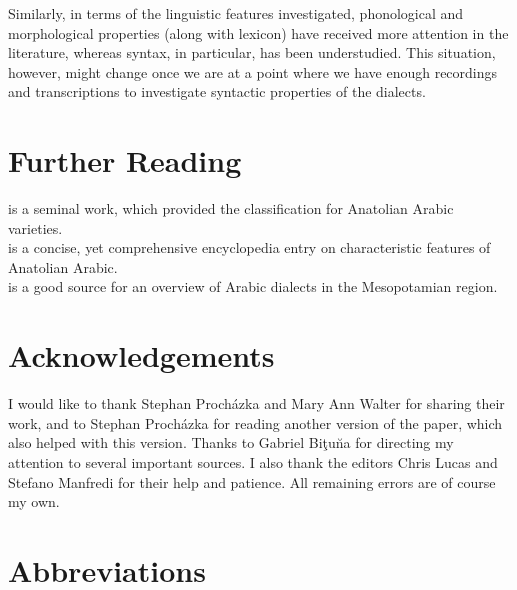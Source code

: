 \documentclass[output=paper]{langsci/langscibook}
\begin{document}
Similarly, in terms of the linguistic features investigated, phonological and morphological properties (along with lexicon) have received more attention in the literature, whereas syntax, in particular, has been understudied. This situation, however, might change once we are at a point where we have enough recordings and transcriptions to investigate syntactic properties of the dialects. 

\section*{Further Reading}
 
\citet{Jastrow1978} is a seminal work, which provided the classification for Anatolian Arabic varieties. \\
\citet{Jastrow2011anatolian} is a concise, yet comprehensive encyclopedia entry on characteristic features of Anatolian Arabic.\\
\noindent \citet{Talay2011} is a good source for an overview of Arabic dialects in the Meso\-potamian region.

\section*{Acknowledgements}
I would like to thank Stephan Proch\'{a}zka and Mary Ann Walter for sharing their work, and to Stephan Proch\'{a}zka for reading another version of the paper, which also helped with this version. Thanks to Gabriel Bi\c{t}u\u{n}a for directing my attention to several important sources. I also thank the editors Chris Lucas and Stefano Manfredi for their help and patience. All remaining errors are of course my own.  

\section*{Abbreviations}
\end{document}
